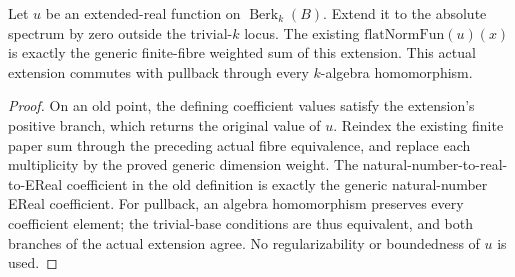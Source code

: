 \begin{theorem}
\label{spectrum:paper-flat-norm-identification}
\leanok
{}
Let $u$ be an extended-real function on $\operatorname{Berk}_k(B)$.
Extend it to the absolute spectrum by zero outside the trivial-$k$ locus.
The existing $\mathrm{flatNormFun}(u)(x)$ is exactly the generic finite-fibre
weighted sum of this extension. This actual extension commutes with
pullback through every $k$-algebra homomorphism.
\end{theorem}
\begin{proof}
On an old point, the defining coefficient values satisfy the extension's
positive branch, which returns the original value of $u$. Reindex the
existing finite paper sum through the preceding actual fibre equivalence,
and replace each multiplicity by the proved generic dimension weight.
The natural-number-to-real-to-EReal coefficient in the old definition is
exactly the generic natural-number EReal coefficient.
For pullback, an algebra homomorphism preserves every coefficient element;
the trivial-base conditions are thus equivalent, and both branches of the
actual extension agree. No regularizability or boundedness of $u$ is used.
\end{proof}

